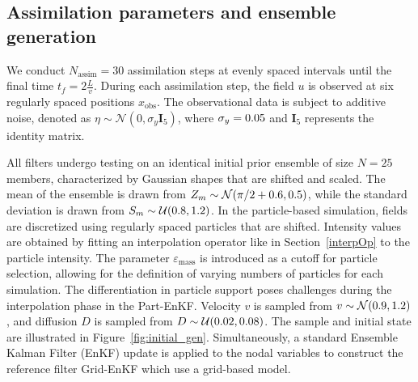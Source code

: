 \subsection{Assimilation parameters and ensemble generation}

We conduct $N_{\text{assim}} = 30$ assimilation steps at evenly spaced intervals until the final time $t_f = 2 \frac{L}{v}$. During each assimilation step, the field $u$ is observed at six regularly spaced positions $x_{\text{obs}}$. The observational data is subject to additive noise, denoted as $\eta \sim \mathcal{N}(0, \sigma_y \bm{I}_5)$, where $\sigma_y = 0.05$ and $\bm{I}_5$ represents the identity matrix.

All filters undergo testing on an identical initial prior ensemble of size $N = 25$ members, characterized by Gaussian shapes that are shifted and scaled. The mean of the ensemble is drawn from $Z_m \sim \mathcal{N}(\pi/2 + 0.6, 0.5)$, while the standard deviation is drawn from $S_m \sim \mathcal{U}(0.8, 1.2)$.
In the particle-based simulation, fields are discretized using regularly spaced particles that are shifted. Intensity values are obtained by fitting an interpolation operator like in Section~\ref{interpOp} to the particle intensity.
The parameter $\varepsilon_{\text{mass}}$ is introduced as a cutoff for particle selection, allowing for the definition of varying numbers of particles for each simulation. The differentiation in particle support poses challenges during the interpolation phase in the Part-EnKF.
Velocity $v$ is sampled from $v \sim \mathcal{N}(0.9, 1.2)$, and diffusion $D$ is sampled from $D \sim \mathcal{U}(0.02, 0.08)$. The sample and initial state are illustrated in Figure~\ref{fig:initial_gen}.
Simultaneously, a standard Ensemble Kalman Filter (EnKF) update is applied to the nodal variables to construct the reference filter Grid-EnKF which use a grid-based model.

